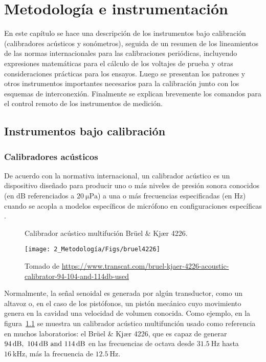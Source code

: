 
\chapter{Metodología e instrumentación}

En este capítulo se hace una descripción de los instrumentos bajo calibración (calibradores acústicos y sonómetros), seguida de un resumen de los lineamientos de las normas internacionales para las calibraciones periódicas, incluyendo expresiones matemáticas para el cálculo de los voltajes de prueba y otras consideraciones prácticas para los ensayos.
Luego se presentan los patrones y otros instrumentos importantes necesarios para la calibración junto con los esquemas de interconexión.
Finalmente se explican brevemente los comandos para el control remoto de los instrumentos de medición.


\section{Instrumentos bajo calibración}

\subsection{Calibradores acústicos}
De acuerdo con la normativa internacional, un calibrador acústico es un dispositivo diseñado para producir uno o más niveles de presión sonora conocidos (en $\unit{\dB}$ referenciados a $\qty{20}{\micro\Pa}$) a una o más frecuencias especificadas (en $\unit{\Hz}$) cuando se acopla a modelos específicos de micrófono en configuraciones específicas .
%
\begin{figure}[!h]
    \caption{Calibrador acústico multifución Brüel \& Kjær 4226.}
    \label{fig:bruel_4226}
    \centering
    \texttt{[image: 2\_Metodología/Figs/bruel4226]}
    \caption*{\footnotesize Tomado de \scriptsize
    \url{https://www.transcat.com/bruel-kjaer-4226-acoustic-calibrator-94-104-and-114db-used}}
\end{figure}

Normalmente, la señal senoidal es generada por algún transductor, como un altavoz o, en el caso de los pistófonos, un pistón mecánico cuyo movimiento genera en la cavidad una velocidad de volumen conocida.
Como ejemplo, en la figura~\ref{fig:bruel_4226} se muestra un calibrador acústico multifunción usado como referencia en muchos laboratorios: el Brüel \& Kjær 4226, que es capaz de generar $\qtylist{94; 104; 114}{\dB}$ en las frecuencias de octava desde $\qty{31.5}{\Hz}$ hasta $\qty{16}{\kHz}$, más la frecuencia de $\qty{12.5}{\Hz}$.

